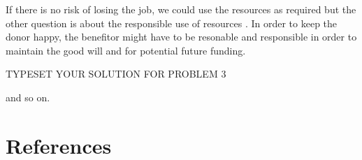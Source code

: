 \documentclass[fleqn,letterpaper,12pt]{report}
\begin{document}
If there is no risk of losing the job, we could use the resources as required but the other question is about the responsible use of resources \cite{cdresources}. In order to keep the donor happy, the benefitor might have to be resonable and responsible in order to maintain the good will and for potential future funding.

\newpage
{}
{}
\problem
TYPESET YOUR SOLUTION FOR PROBLEM 3

\vfill
and so on.

\newpage
{}
\section*{References}


\end{document}
